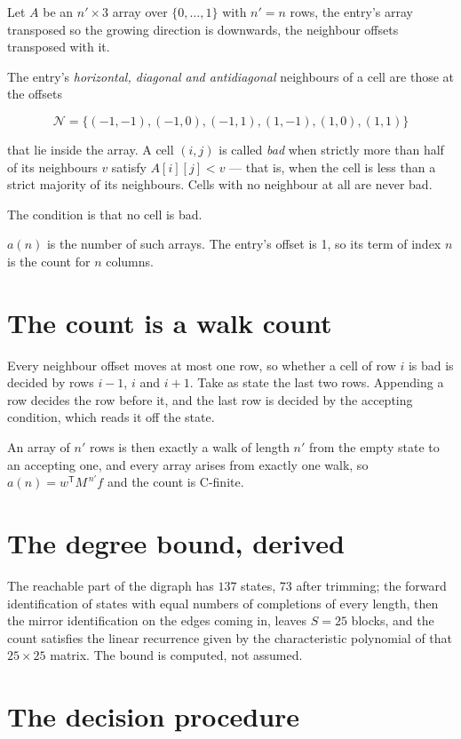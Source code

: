 \documentclass[11pt]{article}
\theoremstyle{definition}
\begin{document}
Let $A$ be an $n' \times 3$ array over $\{0,\dots,1\}$ with $n' = n$ rows, the entry's array transposed so the growing direction is downwards, the neighbour offsets transposed with it.

The entry's {\itshape horizontal, diagonal and antidiagonal} neighbours of a cell are those at the offsets

\[\mathcal{N} = \{(-1,-1), (-1,0), (-1,1), (1,-1), (1,0), (1,1)\}\]

that lie inside the array. A cell $(i,j)$ is called {\itshape bad} when strictly more than half of its neighbours $v$ satisfy $A[i][j] < v$ --- that is, when the cell is less than a strict majority of its neighbours. Cells with no neighbour at all are never bad.

The condition is that no cell is bad.

$a(n)$ is the number of such arrays. The entry's offset is 1, so its term of index $n$ is the count for $n$ columns.

\section{The count is a walk count}

Every neighbour offset moves at most one row, so whether a cell of row $i$ is bad is decided by rows $i-1$, $i$ and $i+1$. Take as state the last two rows. Appending a row decides the row before it, and the last row is decided by the accepting condition, which reads it off the state.

An array of $n'$ rows is then exactly a walk of length $n'$ from the empty state to an accepting one, and every array arises from exactly one walk, so $a(n) = w^{\mathsf T}M^{\,n'}f$ and the count is C-finite.

\section{The degree bound, derived}

The reachable part of the digraph has $137$ states, $73$ after trimming; the forward identification of states with equal numbers of completions of every length, then the mirror identification on the edges coming in, leaves $S = 25$ blocks, and the count satisfies the linear recurrence given by the characteristic polynomial of that $25\times25$ matrix. The bound is computed, not assumed.

\section{The decision procedure}
\end{document}
